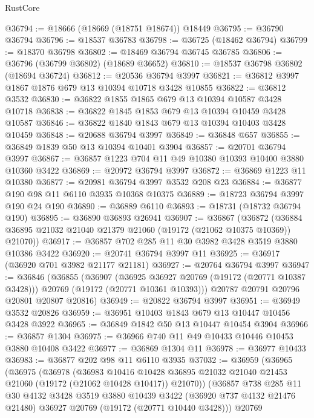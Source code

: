 \begin{lexlean}{RustCore}
\begin{coremodule}
@36794 := @18666 (@18669 (@18751 @18674)) @18449
@36795 := @36790 @36794
@36796 := @18537 @36783
@36798 := @36725 (@18462 @36794)
@36799 := @18370 @36798
@36802 := @18469 @36794 @36745 @36785
@36806 := @36796 (@36799 @36802) (@18689 @36652)
@36810 := @18537 @36798 @36802 (@18694 @36724)
@36812 := @20536 @36794 @3997
@36821 := @36812 @3997 @1867 @1876 @679 @13 @10394 @10718 @3428 @10855
@36822 := @36812 @3532
@36830 := @36822 @1855 @1865 @679 @13 @10394 @10587 @3428 @10718
@36838 := @36822 @1845 @1853 @679 @13 @10394 @10459 @3428 @10587
@36846 := @36822 @1840 @1843 @679 @13 @10394 @10403 @3428 @10459
@36848 := @20688 @36794 @3997
@36849 := @36848 @657
@36855 := @36849 @1839 @50 @13 @10394 @10401 @3904
@36857 := @20701 @36794 @3997
@36867 := @36857 @1223 @704 @11 @49 @10380 @10393 @10400 @3880 @10360 @3422
@36869 := @20972 @36794 @3997
@36872 := @36869 @1223 @11 @10380
@36877 := @20981 @36794 @3997 @3532 @208 @23
@36884 := @36877 @190 @98 @11 @6110 @3935 @10368 @10375
@36889 := @18723 @36794 @3997 @190 @24 @190
@36890 := @36889 @6110
@36893 := @18731 (@18732 @36794 @190)
@36895 := @36890 @36893 @26941
@36907 := @36867
    (@36872 (@36884 @36895 @21032 @21040 @21379 @21060 (@19172 (@21062 @10375 @10369)) @21070))
@36917 := @36857 @702 @285 @11 @30 @3982 @3428 @3519 @3880 @10386 @3422
@36920 := @20741 @36794 @3997 @11
@36925 := @36917 (@36920 @701 @3982 @21177 @21181)
@36927 := @20764 @36794 @3997
@36947 := @36846
    (@36855
      (@36907
        (@36925 @36927 @20769 (@19172 (@20771 @10387 @3428)))
        @20769
        (@19172 (@20771 @10361 @10393)))
      @20787
      @20791
      @20796
      @20801
      @20807
      @20816)
@36949 := @20822 @36794 @3997
@36951 := @36949 @3532 @20826
@36959 := @36951 @10403 @1843 @679 @13 @10447 @10456 @3428 @3922
@36965 := @36849 @1842 @50 @13 @10447 @10454 @3904
@36966 := @36857 @1304
@36975 := @36966 @740 @11 @49 @10433 @10446 @10453 @3880 @10408 @3422
@36977 := @36869 @1304 @11
@36978 := @36977 @10433
@36983 := @36877 @202 @98 @11 @6110 @3935
@37032 := @36959
    (@36965
      (@36975
        (@36978
          (@36983
            @10416
            @10428
            @36895
            @21032
            @21040
            @21453
            @21060
            (@19172 (@21062 @10428 @10417))
            @21070))
        (@36857
          @738
          @285
          @11
          @30
          @4132
          @3428
          @3519
          @3880
          @10439
          @3422
          (@36920 @737 @4132 @21476 @21480)
          @36927
          @20769
          (@19172 (@20771 @10440 @3428)))
        @20769

\end{coremodule}
\end{lexlean}
